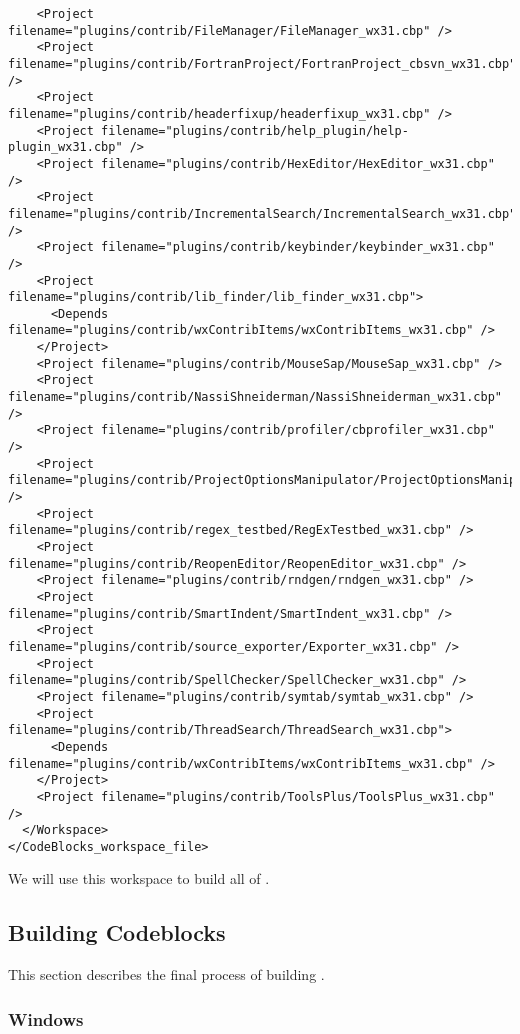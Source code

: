 \begin{verbatim}
    <Project filename="plugins/contrib/FileManager/FileManager_wx31.cbp" />
    <Project filename="plugins/contrib/FortranProject/FortranProject_cbsvn_wx31.cbp" />
    <Project filename="plugins/contrib/headerfixup/headerfixup_wx31.cbp" />
    <Project filename="plugins/contrib/help_plugin/help-plugin_wx31.cbp" />
    <Project filename="plugins/contrib/HexEditor/HexEditor_wx31.cbp" />
    <Project filename="plugins/contrib/IncrementalSearch/IncrementalSearch_wx31.cbp" />
    <Project filename="plugins/contrib/keybinder/keybinder_wx31.cbp" />
    <Project filename="plugins/contrib/lib_finder/lib_finder_wx31.cbp">
      <Depends filename="plugins/contrib/wxContribItems/wxContribItems_wx31.cbp" />
    </Project>
    <Project filename="plugins/contrib/MouseSap/MouseSap_wx31.cbp" />
    <Project filename="plugins/contrib/NassiShneiderman/NassiShneiderman_wx31.cbp" />
    <Project filename="plugins/contrib/profiler/cbprofiler_wx31.cbp" />
    <Project filename="plugins/contrib/ProjectOptionsManipulator/ProjectOptionsManipulator_wx31.cbp" />
    <Project filename="plugins/contrib/regex_testbed/RegExTestbed_wx31.cbp" />
    <Project filename="plugins/contrib/ReopenEditor/ReopenEditor_wx31.cbp" />
    <Project filename="plugins/contrib/rndgen/rndgen_wx31.cbp" />
    <Project filename="plugins/contrib/SmartIndent/SmartIndent_wx31.cbp" />
    <Project filename="plugins/contrib/source_exporter/Exporter_wx31.cbp" />
    <Project filename="plugins/contrib/SpellChecker/SpellChecker_wx31.cbp" />
    <Project filename="plugins/contrib/symtab/symtab_wx31.cbp" />
    <Project filename="plugins/contrib/ThreadSearch/ThreadSearch_wx31.cbp">
      <Depends filename="plugins/contrib/wxContribItems/wxContribItems_wx31.cbp" />
    </Project>
    <Project filename="plugins/contrib/ToolsPlus/ToolsPlus_wx31.cbp" />
  </Workspace>
</CodeBlocks_workspace_file>
\end{verbatim}


We will use this workspace to build all of \codeblocks. 


\subsection{Building Codeblocks}

This section describes the final process of building \codeblocks.

\subsubsection{Windows}


